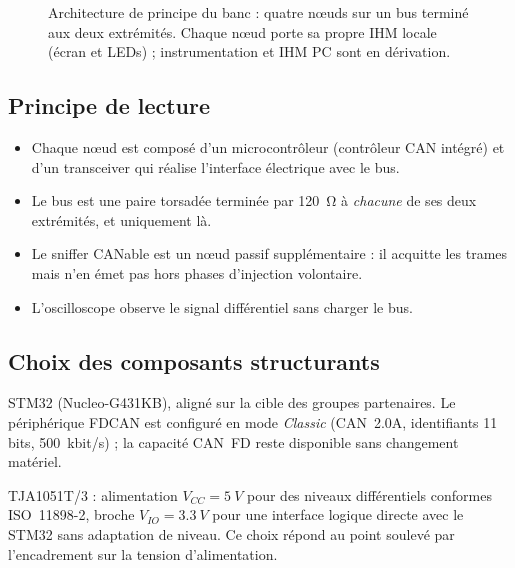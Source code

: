 \documentclass[11pt,a4paper]{article}
\begin{document}
\begin{figure}[h]
\caption{Architecture de principe du banc : quatre nœuds sur un bus terminé aux deux extrémités.
Chaque nœud porte sa propre IHM locale (écran et LEDs) ; instrumentation et IHM PC sont en dérivation.}
\label{fig:archi}
\end{figure}

\subsection{Principe de lecture}
\begin{itemize}[nosep]
  \item Chaque nœud est composé d'un microcontrôleur (contrôleur CAN intégré) et d'un transceiver
        qui réalise l'interface électrique avec le bus.
  \item Le bus est une paire torsadée terminée par \SI{120}{\ohm} à \emph{chacune} de ses deux
        extrémités, et uniquement là.
  \item Le sniffer CANable est un nœud passif supplémentaire : il acquitte les trames mais n'en émet
        pas hors phases d'injection volontaire.
  \item L'oscilloscope observe le signal différentiel sans charger le bus.
\end{itemize}

\subsection{Choix des composants structurants}
\begin{description}[nosep]
  \item[Microcontrôleur] STM32 (Nucleo-G431KB), aligné sur la cible des groupes partenaires.
        Le périphérique FDCAN est configuré en mode \emph{Classic} (CAN~2.0A, identifiants 11 bits,
        \SI{500}{kbit/s}) ; la capacité CAN~FD reste disponible sans changement matériel.
  \item[Transceiver] TJA1051T/3 : alimentation $V_{CC}=\SI{5}{V}$ pour des niveaux différentiels
        conformes ISO~11898-2, broche $V_{IO}=\SI{3.3}{V}$ pour une interface logique directe avec
        le STM32 sans adaptation de niveau. Ce choix répond au point soulevé par l'encadrement sur
        la tension d'alimentation.
\end{description}
\end{document}
